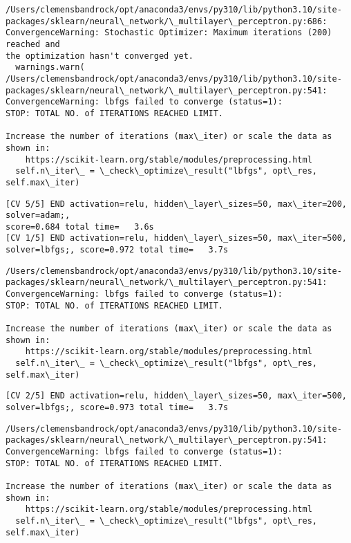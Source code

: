 \documentclass[11pt]{article}
\begin{document}
    \begin{Verbatim}[commandchars=\\\{\}]
/Users/clemensbandrock/opt/anaconda3/envs/py310/lib/python3.10/site-
packages/sklearn/neural\_network/\_multilayer\_perceptron.py:686:
ConvergenceWarning: Stochastic Optimizer: Maximum iterations (200) reached and
the optimization hasn't converged yet.
  warnings.warn(
/Users/clemensbandrock/opt/anaconda3/envs/py310/lib/python3.10/site-
packages/sklearn/neural\_network/\_multilayer\_perceptron.py:541:
ConvergenceWarning: lbfgs failed to converge (status=1):
STOP: TOTAL NO. of ITERATIONS REACHED LIMIT.

Increase the number of iterations (max\_iter) or scale the data as shown in:
    https://scikit-learn.org/stable/modules/preprocessing.html
  self.n\_iter\_ = \_check\_optimize\_result("lbfgs", opt\_res, self.max\_iter)
    \end{Verbatim}

    \begin{Verbatim}[commandchars=\\\{\}]
[CV 5/5] END activation=relu, hidden\_layer\_sizes=50, max\_iter=200, solver=adam;,
score=0.684 total time=   3.6s
[CV 1/5] END activation=relu, hidden\_layer\_sizes=50, max\_iter=500,
solver=lbfgs;, score=0.972 total time=   3.7s
    \end{Verbatim}

    \begin{Verbatim}[commandchars=\\\{\}]
/Users/clemensbandrock/opt/anaconda3/envs/py310/lib/python3.10/site-
packages/sklearn/neural\_network/\_multilayer\_perceptron.py:541:
ConvergenceWarning: lbfgs failed to converge (status=1):
STOP: TOTAL NO. of ITERATIONS REACHED LIMIT.

Increase the number of iterations (max\_iter) or scale the data as shown in:
    https://scikit-learn.org/stable/modules/preprocessing.html
  self.n\_iter\_ = \_check\_optimize\_result("lbfgs", opt\_res, self.max\_iter)
    \end{Verbatim}

    \begin{Verbatim}[commandchars=\\\{\}]
[CV 2/5] END activation=relu, hidden\_layer\_sizes=50, max\_iter=500,
solver=lbfgs;, score=0.973 total time=   3.7s
    \end{Verbatim}

    \begin{Verbatim}[commandchars=\\\{\}]
/Users/clemensbandrock/opt/anaconda3/envs/py310/lib/python3.10/site-
packages/sklearn/neural\_network/\_multilayer\_perceptron.py:541:
ConvergenceWarning: lbfgs failed to converge (status=1):
STOP: TOTAL NO. of ITERATIONS REACHED LIMIT.

Increase the number of iterations (max\_iter) or scale the data as shown in:
    https://scikit-learn.org/stable/modules/preprocessing.html
  self.n\_iter\_ = \_check\_optimize\_result("lbfgs", opt\_res, self.max\_iter)
    \end{Verbatim}
\end{document}
